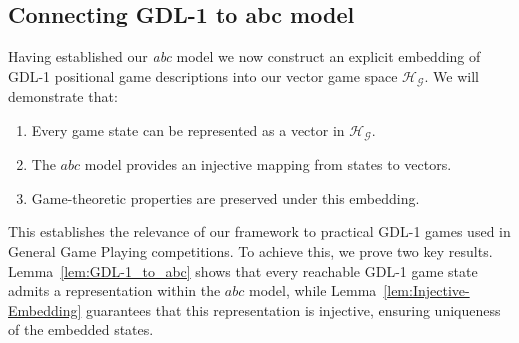 \documentclass[11pt,a4paper]{article}
\theoremstyle{plain}
\theoremstyle{definition}
\begin{document}
\vspace{0.5em}

\subsection{Connecting GDL-1 to abc model}
\label{sec:gdl-connection}

\vspace{0.5em}

Having established our \emph{abc} model we now construct an explicit embedding of GDL-1 positional game descriptions into our vector game space $\mathcal{H}_\mathcal{G}$. We will demonstrate that:

\vspace{0.5em}

\begin{enumerate}
\item Every game state can be represented as a vector in $\mathcal{H}_\mathcal{G}$.
\item The $abc$ model provides an injective mapping from states to vectors.
\item Game-theoretic properties are preserved under this embedding.
\end{enumerate}

\vspace{0.5em}

This establishes the relevance of our framework to practical GDL-1 games used
in General Game Playing competitions. To achieve this, we prove two key results.
Lemma~\ref{lem:GDL-1_to_abc} shows that every reachable GDL-1 game state admits a
representation within the $abc$ model, while Lemma~\ref{lem:Injective-Embedding} guarantees that this representation is injective, ensuring uniqueness of the embedded states.

\vspace{0.5em}

\end{document}
